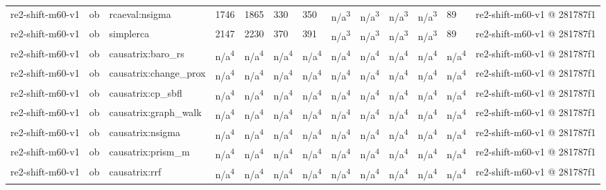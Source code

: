 \begin{table}[t]
\begin{tabular}{lllllllllllll}
re2-shift-m60-v1 & ob & rcaeval:nsigma & 1746 & 1865 & 330 & 350 & n/a\textsuperscript{3} & n/a\textsuperscript{3} & n/a\textsuperscript{3} & n/a\textsuperscript{3} & 89 & re2-shift-m60-v1 @ 281787f1 \\
re2-shift-m60-v1 & ob & simplerca & 2147 & 2230 & 370 & 391 & n/a\textsuperscript{3} & n/a\textsuperscript{3} & n/a\textsuperscript{3} & n/a\textsuperscript{3} & 89 & re2-shift-m60-v1 @ 281787f1 \\
re2-shift-m60-v1 & ob & causatrix:baro\_rs & n/a\textsuperscript{4} & n/a\textsuperscript{4} & n/a\textsuperscript{4} & n/a\textsuperscript{4} & n/a\textsuperscript{4} & n/a\textsuperscript{4} & n/a\textsuperscript{4} & n/a\textsuperscript{4} & n/a\textsuperscript{4} & re2-shift-m60-v1 @ 281787f1 \\
re2-shift-m60-v1 & ob & causatrix:change\_prox & n/a\textsuperscript{4} & n/a\textsuperscript{4} & n/a\textsuperscript{4} & n/a\textsuperscript{4} & n/a\textsuperscript{4} & n/a\textsuperscript{4} & n/a\textsuperscript{4} & n/a\textsuperscript{4} & n/a\textsuperscript{4} & re2-shift-m60-v1 @ 281787f1 \\
re2-shift-m60-v1 & ob & causatrix:cp\_sbfl & n/a\textsuperscript{4} & n/a\textsuperscript{4} & n/a\textsuperscript{4} & n/a\textsuperscript{4} & n/a\textsuperscript{4} & n/a\textsuperscript{4} & n/a\textsuperscript{4} & n/a\textsuperscript{4} & n/a\textsuperscript{4} & re2-shift-m60-v1 @ 281787f1 \\
re2-shift-m60-v1 & ob & causatrix:graph\_walk & n/a\textsuperscript{4} & n/a\textsuperscript{4} & n/a\textsuperscript{4} & n/a\textsuperscript{4} & n/a\textsuperscript{4} & n/a\textsuperscript{4} & n/a\textsuperscript{4} & n/a\textsuperscript{4} & n/a\textsuperscript{4} & re2-shift-m60-v1 @ 281787f1 \\
re2-shift-m60-v1 & ob & causatrix:nsigma & n/a\textsuperscript{4} & n/a\textsuperscript{4} & n/a\textsuperscript{4} & n/a\textsuperscript{4} & n/a\textsuperscript{4} & n/a\textsuperscript{4} & n/a\textsuperscript{4} & n/a\textsuperscript{4} & n/a\textsuperscript{4} & re2-shift-m60-v1 @ 281787f1 \\
re2-shift-m60-v1 & ob & causatrix:prism\_m & n/a\textsuperscript{4} & n/a\textsuperscript{4} & n/a\textsuperscript{4} & n/a\textsuperscript{4} & n/a\textsuperscript{4} & n/a\textsuperscript{4} & n/a\textsuperscript{4} & n/a\textsuperscript{4} & n/a\textsuperscript{4} & re2-shift-m60-v1 @ 281787f1 \\
re2-shift-m60-v1 & ob & causatrix:rrf & n/a\textsuperscript{4} & n/a\textsuperscript{4} & n/a\textsuperscript{4} & n/a\textsuperscript{4} & n/a\textsuperscript{4} & n/a\textsuperscript{4} & n/a\textsuperscript{4} & n/a\textsuperscript{4} & n/a\textsuperscript{4} & re2-shift-m60-v1 @ 281787f1 \\

\end{tabular}
\end{table}
